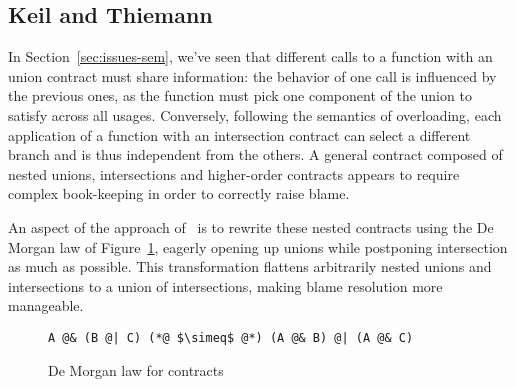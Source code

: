 \documentclass[sigplan,10pt,review,anonymous]{acmart}
\newcommand{\unsure}[2][1=]{}
\begin{document}

\subsection{Keil and Thiemann}
\label{sec:keil-thiemann}
\unsure{Subsection title?}

In Section~\ref{sec:issues-sem}, we've seen that different calls to a function
with an union contract must share information: the behavior of one call is
influenced by the previous ones, as the function must pick one component of the
union to satisfy across all usages. Conversely, following the semantics of
overloading, each application of a function with an intersection contract can
select a different branch and is thus independent from the others. A general
contract composed of nested unions, intersections and higher-order contracts
appears to require complex book-keeping in order to correctly raise blame.

An aspect of the approach of~\cite{KeilThiemannUnionIntersection} is to rewrite
these nested contracts using the De Morgan law of
Figure~\ref{fig:de-morgan-law}, eagerly opening up unions while postponing
intersection as much as possible.   This transformation flattens arbitrarily nested unions and
intersections to a union of intersections, making blame resolution more
manageable.\unsure{(Yann) find better (more precise) wording}

\begin{figure}[h]
\begin{lstlisting}[frame=none, numbers=none, language=nickel]
A @& (B @| C) (*@ $\simeq$ @*) (A @& B) @| (A @& C)
\end{lstlisting}
\caption{De Morgan law for contracts}
\label{fig:de-morgan-law}
\end{figure}
\end{document}
